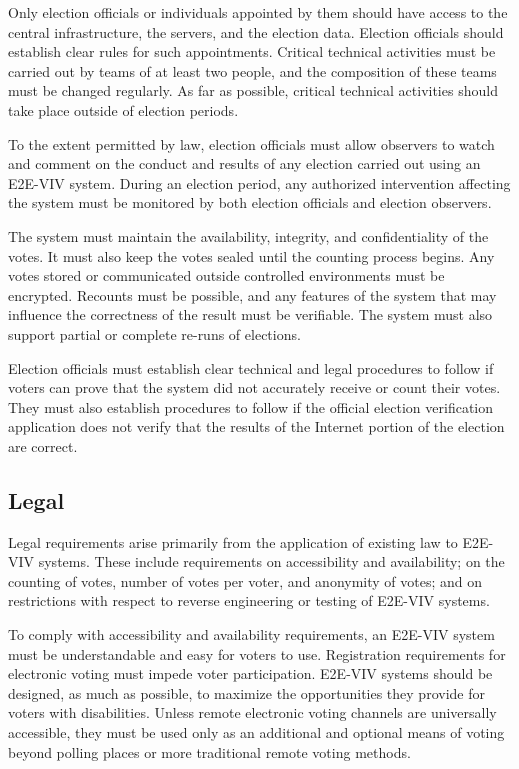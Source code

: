 Only election officials or individuals appointed by them should have
access to the central infrastructure, the servers, and the election
data. Election officials should establish clear rules for such
appointments. Critical technical activities must be carried out by
teams of at least two people, and the composition of these teams must
be changed regularly. As far as possible, critical technical
activities should take place outside of election periods.

To the extent permitted by law, election officials must allow
observers to watch and comment on the conduct and results of any
election carried out using an E2E-VIV system. During an election
period, any authorized intervention affecting the system must be
monitored by both election officials and election observers.

The system must maintain the availability, integrity, and
confidentiality of the votes. It must also keep the votes sealed until
the counting process begins. Any votes stored or communicated outside
controlled environments must be encrypted. Recounts must be possible,
and any features of the system that may influence the correctness of
the result must be verifiable. The system must also support partial or
complete re-runs of elections. 

Election officials must establish clear technical and legal procedures
to follow if voters can prove that the system did not accurately
receive or count their votes. They must also establish procedures to
follow if the official election verification application does not
verify that the results of the Internet portion of the election are
correct.

\subsection{Legal}

Legal requirements arise primarily from the application of existing
law to E2E-VIV systems. These include requirements on accessibility
and availability; on the counting of votes, number of votes per voter,
and anonymity of votes; and on restrictions with respect to reverse
engineering or testing of E2E-VIV systems.

To comply with accessibility and availability requirements, an E2E-VIV
system must be understandable and easy for voters to use. Registration
requirements for electronic voting must impede voter
participation. E2E-VIV systems should be designed, as much as
possible, to maximize the opportunities they provide for voters with
disabilities. Unless remote electronic voting channels are universally
accessible, they must be used only as an additional and optional means
of voting beyond polling places or more traditional remote voting
methods.

